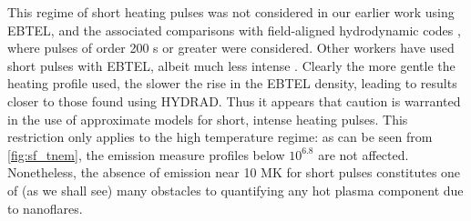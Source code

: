 \documentclass[]{aastex}
\begin{document}
	\par This regime of short heating pulses was not considered in our earlier work using EBTEL, and the associated comparisons with field-aligned hydrodynamic codes \citep{klimchuk_highly_2008,cargill_enthalpy-based_2012}, where pulses of order 200 s or greater were considered. Other workers have used short pulses with EBTEL, albeit much less intense \citep{tajfirouze_euv_2016,tajfirouze_time-resolved_2016}. Clearly the more gentle the heating profile used, the slower the rise in the EBTEL density, leading to results closer to those found using HYDRAD. Thus it appears that caution is warranted in the use of approximate models for short, intense heating pulses. This restriction only applies to the high temperature regime: as can be seen from \autoref{fig:sf_tnem}, the emission measure profiles below $10^{6.8}$ are not affected. Nonetheless, the absence of emission near 10 MK for short pulses constitutes one of (as we shall see) many obstacles to quantifying any hot plasma component due to nanoflares.
\end{document}
